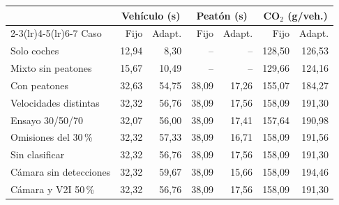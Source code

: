 \begin{tabularx}{\linewidth}{@{}Xrr@{\hspace{1em}}rr@{\hspace{1em}}rr@{}}\toprule
 & \multicolumn{2}{c}{Vehículo (s)} & \multicolumn{2}{c}{Peatón (s)} & \multicolumn{2}{c}{CO$_2$ (g/veh.)}\\
\cmidrule(lr){2-3}\cmidrule(lr){4-5}\cmidrule(lr){6-7}
Caso & Fijo & Adapt. & Fijo & Adapt. & Fijo & Adapt.\\\midrule
Solo coches & 12,94 & 8,30 & -- & -- & 128,50 & 126,53\\
Mixto sin peatones & 15,67 & 10,49 & -- & -- & 129,66 & 124,16\\
Con peatones & 32,63 & 54,75 & 38,09 & 17,26 & 155,07 & 184,27\\
Velocidades distintas & 32,32 & 56,76 & 38,09 & 17,56 & 158,09 & 191,30\\
Ensayo 30/50/70 & 32,07 & 56,00 & 38,09 & 17,41 & 157,64 & 190,98\\
Omisiones del 30\,\% & 32,32 & 57,33 & 38,09 & 16,71 & 158,09 & 191,56\\
Sin clasificar & 32,32 & 56,76 & 38,09 & 17,56 & 158,09 & 191,30\\
Cámara sin detecciones & 32,32 & 59,67 & 38,09 & 15,66 & 158,09 & 194,46\\
Cámara y V2I 50\,\% & 32,32 & 56,76 & 38,09 & 17,56 & 158,09 & 191,30\\
\bottomrule\end{tabularx}